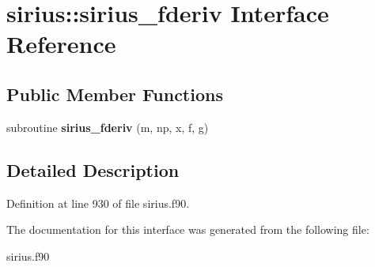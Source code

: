 \hypertarget{interfacesirius_1_1sirius__fderiv}{}\section{sirius\+:\+:sirius\+\_\+fderiv Interface Reference}
\label{interfacesirius_1_1sirius__fderiv}
\subsection*{Public Member Functions}
\begin{DoxyCompactItemize}
\item 
\hypertarget{interfacesirius_1_1sirius__fderiv_aacb9dfe0bb764f0e7e13238a43564b7f}{}subroutine {\bfseries sirius\+\_\+fderiv} (m, np, x, f, g)\label{interfacesirius_1_1sirius__fderiv_aacb9dfe0bb764f0e7e13238a43564b7f}

\end{DoxyCompactItemize}


\subsection{Detailed Description}


Definition at line 930 of file sirius.\+f90.



The documentation for this interface was generated from the following file\+:\begin{DoxyCompactItemize}
\item 
sirius.\+f90\end{DoxyCompactItemize}
